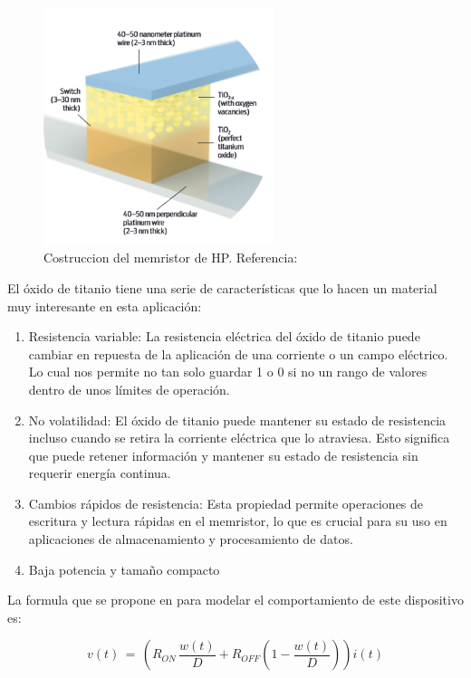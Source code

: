 \documentclass[12pt,a4paper]{report} %
\begin{document}
	\begin{figure}[h]
		\centering
		\includegraphics[width=0.6\textwidth]{mem1.png}
		\caption{Costruccion del memristor de HP. Referencia: \cite{williams}}
		\label{fig:mem1}
	\end{figure}
	
	El óxido de titanio tiene una serie de características que lo hacen un material muy interesante en esta aplicación:
	\begin{enumerate}
		\item Resistencia variable: La resistencia eléctrica del óxido de titanio puede cambiar en repuesta de la aplicación de una corriente o un campo eléctrico. Lo cual nos permite no tan solo guardar 1 o 0 si no un rango de valores dentro de unos límites de operación.
		\item No volatilidad: El óxido de titanio puede mantener su estado de resistencia incluso cuando se retira la corriente eléctrica que lo atraviesa. Esto significa que puede retener información y mantener su estado de resistencia sin requerir energía continua.
		\item Cambios rápidos de resistencia:  Esta propiedad permite operaciones de escritura y lectura rápidas en el memristor, lo que es crucial para su uso en aplicaciones de almacenamiento y procesamiento de datos.
		\item Baja potencia y tamaño compacto
	\end{enumerate}
	\newpage
	
	La formula que se propone en \cite{HP} para modelar el comportamiento de este dispositivo es:
	
	\begin{equation}
		v(t)\,=\,\left(R_{ON}\,\frac{w(t)}{D}+R_{OFF}\left(1-\frac{w(t)}{D}\right)\right)i(t)
		\label{eq:hp1}
	\end{equation}
	
\end{document}
